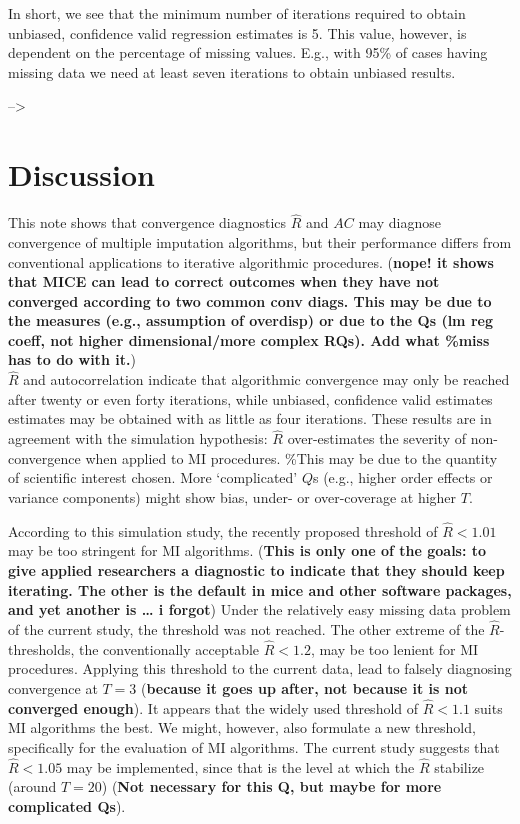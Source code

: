 \documentclass[Royal,times,sageh]{sagej}
\begin{document}
In short, we see that the minimum number of iterations required to
obtain unbiased, confidence valid regression estimates is 5. This value,
however, is dependent on the percentage of missing values. E.g., with
95\% of cases having missing data we need at least seven iterations to
obtain unbiased results.

--\textgreater{}

\hypertarget{discussion}{%
\section{Discussion}\label{discussion}}

This note shows that convergence diagnostics \(\widehat{R}\) and \(AC\)
may diagnose convergence of multiple imputation algorithms, but their
performance differs from conventional applications to iterative
algorithmic procedures. (\textbf{nope! it shows that MICE can lead to
correct outcomes when they have not converged according to two common
conv diags. This may be due to the measures (e.g., assumption of
overdisp) or due to the Qs (lm reg coeff, not higher dimensional/more
complex RQs). Add what \%miss has to do with it.})\\
\(\widehat{R}\) and autocorrelation indicate that algorithmic
convergence may only be reached after twenty or even forty iterations,
while unbiased, confidence valid estimates estimates may be obtained
with as little as four iterations. These results are in agreement with
the simulation hypothesis: \(\widehat{R}\) over-estimates the severity
of non-convergence when applied to MI procedures. \%This may be due to
the quantity of scientific interest chosen. More `complicated' \(Q\)s
(e.g., higher order effects or variance components) might show bias,
under- or over-coverage at higher \(T\).

According to this simulation study, the recently proposed threshold of
\(\widehat{R}<1.01\) may be too stringent for MI algorithms.
(\textbf{This is only one of the goals: to give applied researchers a
diagnostic to indicate that they should keep iterating. The other is the
default in mice and other software packages, and yet another is \ldots{}
i forgot}) Under the relatively easy missing data problem of the current
study, the threshold was not reached. The other extreme of the
\(\widehat{R}\)-thresholds, the conventionally acceptable
\(\widehat{R} <1.2\), may be too lenient for MI procedures. Applying
this threshold to the current data, lead to falsely diagnosing
convergence at \(T = 3\) (\textbf{because it goes up after, not because
it is not converged enough}). It appears that the widely used threshold
of \(\widehat{R} < 1.1\) suits MI algorithms the best. We might,
however, also formulate a new threshold, specifically for the evaluation
of MI algorithms. The current study suggests that \(\widehat{R} < 1.05\)
may be implemented, since that is the level at which the \(\widehat{R}\)
stabilize (around \(T = 20\)) (\textbf{Not necessary for this Q, but
maybe for more complicated Qs}).
\end{document}
